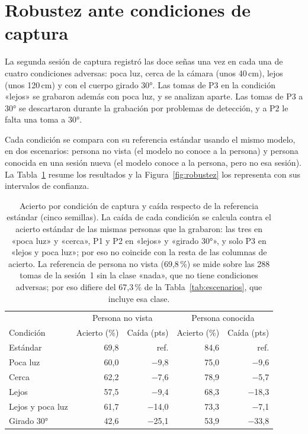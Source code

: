 \section{Robustez ante condiciones de captura}
\label{sec:res-robustez}

La segunda sesión de captura registró las doce señas una vez en cada una de cuatro condiciones adversas: poca luz, cerca de la cámara (unos 40\,cm), lejos (unos 120\,cm) y con el cuerpo girado 30°. Las tomas de P3 en la condición «lejos» se grabaron además con poca luz, y se analizan aparte. Las tomas de P3 a 30° se descartaron durante la grabación por problemas de detección, y a P2 le falta una toma a 30°.

Cada condición se compara con su referencia estándar usando el mismo modelo, en dos escenarios: persona no vista (el modelo no conoce a la persona) y persona conocida en una sesión nueva (el modelo conoce a la persona, pero no esa sesión). La Tabla~\ref{tab:robustez} resume los resultados y la Figura~\ref{fig:robustez} los representa con sus intervalos de confianza.

\begin{table}[h]
    \centering
    \small
    \begin{tabular}{lrrrr}
        \toprule
        & \multicolumn{2}{c}{Persona no vista} & \multicolumn{2}{c}{Persona conocida} \\
        Condición & Acierto (\%) & Caída (pts) & Acierto (\%) & Caída (pts) \\
        \midrule
        Estándar & 69,8 & ref. & 84,6 & ref. \\
        Poca luz & 60,0 & $-$9,8 & 75,0 & $-$9,6 \\
        Cerca & 62,2 & $-$7,6 & 78,9 & $-$5,7 \\
        Lejos & 57,5 & $-$9,4 & 68,3 & $-$18,3 \\
        Lejos y poca luz & 61,7 & $-$14,0 & 73,3 & $-$7,1 \\
        Girado 30° & 42,6 & $-$25,1 & 53,9 & $-$33,8 \\
        \bottomrule
    \end{tabular}
    \caption{Acierto por condición de captura y caída respecto de la referencia estándar (cinco semillas). La caída de cada condición se calcula contra el acierto estándar de las mismas personas que la grabaron: las tres en «poca luz» y «cerca», P1 y P2 en «lejos» y «girado 30°», y solo P3 en «lejos y poca luz»; por eso no coincide con la resta de las columnas de acierto. La referencia de persona no vista (69,8\,\%) se mide sobre las 288 tomas de la sesión~1 sin la clase «nada», que no tiene condiciones adversas; por eso difiere del 67,3\,\% de la Tabla~\ref{tab:escenarios}, que incluye esa clase.}
    \label{tab:robustez}
\end{table}

